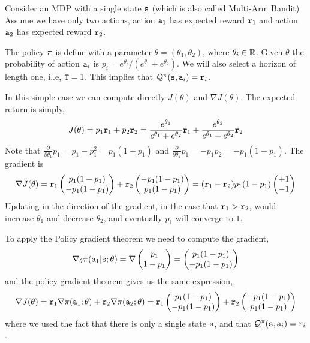\begin{example}\label{example:mab_pg}
Consider an MDP with a single state ${\tt s}$ (which is also called
Multi-Arm Bandit)
Assume we have only two actions, action ${\tt a}_1$ has expected
reward ${\tt r}_1$ and action ${\tt a}_2$ has expected reward
${\tt r}_2$.

The policy $\pi$ is define with a parameter
$\theta=(\theta_1,\theta_2)$, where $\theta_i\in \mathbb{R}$. Given
$\theta$ the probability of action ${\tt a}_i$ is
$p_i=e^{\theta_i}/(e^{\theta_1}+e^{\theta_2})$. We will also select
a horizon of length one, i..e, ${\tt T}=1$. This implies that
$\mathcal{Q}^\pi({\tt s},{\tt a}_i)={\tt r}_i$.

In this simple case we can compute directly $J(\theta)$ and $\nabla
J(\theta)$. The expected return is simply,
\[
J(\theta)=p_1 {\tt r}_1 + p_2 {\tt r}_2 =
\frac{e^{\theta_1}}{e^{\theta_1}+e^{\theta_2}} {\tt r}_1 +
\frac{e^{\theta_2}}{e^{\theta_1}+e^{\theta_2}} {\tt r}_2
\]
Note that $\frac{\partial}{\partial \theta_1} p_1=
p_1-p_1^2=p_1(1-p_1) $ and $\frac{\partial }{\partial \theta_2} p_1=
- p_1 p_2= -p_1(1-p_1)$. The gradient is
\[
\nabla J(\theta)= {\tt r}_1 \begin{pmatrix} p_1(1-p_1)\\
-p_1(1-p_1)\end{pmatrix} + {\tt r}_2 \begin{pmatrix} -p_1(1-p_1)\\
p_1(1-p_1)\end{pmatrix} = ({\tt r}_1-{\tt r}_2) p_1(1-p_1) \begin{pmatrix}+1\\
-1\end{pmatrix}
\]
Updating in the direction of the gradient, in the case that
${\tt r}_1>{\tt r}_2$, would increase $\theta_1$ and decrease
$\theta_2$, and eventually $p_1$ will converge to $1$.

To apply the Policy gradient theorem we need to compute the
gradient,
\[
\nabla_\theta \pi({\tt a}_1|{\tt s};\theta) = \nabla \begin{pmatrix} p_1\\
1-p_1\end{pmatrix}=  \begin{pmatrix} p_1(1-p_1)\\
-p_1(1-p_1)\end{pmatrix}
\]
and the policy gradient theorem gives us the same expression,
\[
\nabla J(\theta) = {\tt r}_1 \nabla
\pi({\tt a}_1;\theta)+{\tt r}_2 \nabla
\pi({\tt a}_2;\theta)={\tt r}_1 \begin{pmatrix} p_1(1-p_1)\\
-p_1(1-p_1)\end{pmatrix} + {\tt r}_2 \begin{pmatrix} -p_1(1-p_1)\\
p_1(1-p_1)\end{pmatrix}
\]
where we used the fact that there is only a single state ${\tt s}$,
and that $\mathcal{Q}^\pi({\tt s},{\tt a}_i)={\tt r}_i$.
\end{example}

